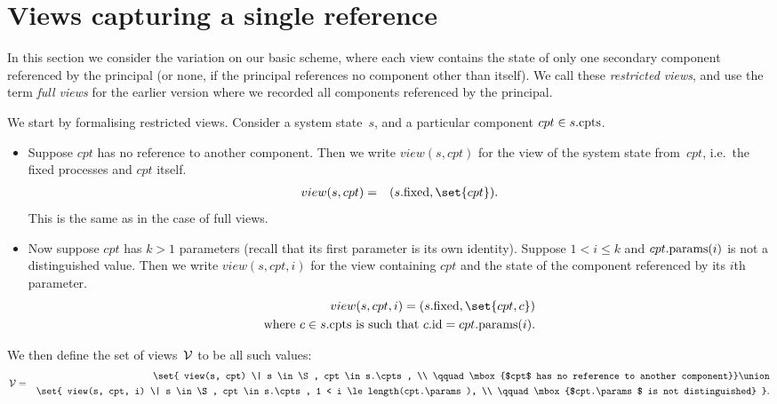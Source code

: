 \section{Views capturing a single reference}
\label{sec:singleRef}

In this section we consider the variation on our basic scheme, where each view
contains the state of only one secondary component referenced by the principal
(or none, if the principal references no component other than itself).  We
call these \emph{restricted views}, and use the term \emph{full views} for the
earlier version where we recorded all components referenced by the principal. 

We start by formalising restricted views.  Consider a system state~$s$, and a
particular component $cpt \in s.\mathrm{cpts}$.
\begin{itemize}
\item 
Suppose $cpt$ has no reference to another component.  Then we write $view(s,
cpt)$ for the view of the system state from~$cpt$, i.e.~the fixed processes
and $cpt$ itself.
\begin{eqnarray*}
view(s, cpt) & = &  (s.\fixed, \set{cpt}).
\end{eqnarray*}
This is the same as in the case of full views.

\item
Now suppose $cpt$ has $k > 1$ parameters (recall that its first parameter is
its own identity).  Suppose $1 < i \le k$ and $cpt.\mathrm{params}(i)$ is not a
distinguished value.  Then we write $view(s, cpt, i)$ for the view containing
$cpt$ and the state of the component referenced by its $i$th parameter.
\[
\begin{align}
view(s, cpt, i)  =  (s.\fixed, \set{cpt, c})\\ 
\mbox{where $c \in s.\cpt$ is such that $c.\id = cpt.\params(i)$}.
\end{align}
\]
\end{itemize}
%
We then define the set of views~$\mathcal{V}$ to be all such values:
%
\begin{eqnarray*}
\V & = & 
  \begin{align}
  \set{ view(s, cpt) \| s \in \S, cpt \in s.\cpts, \\
    \qquad   \mbox{$cpt$ has no reference to another component}} \union\null
  \\
  \set{ view(s, cpt, i) \| s \in \S, cpt \in s.\cpts, 
    1 < i \le length(cpt.\params), \\
    \qquad \mbox{$cpt.\params$ is not distinguished} }.
  \end{align}
\end{eqnarray*}

